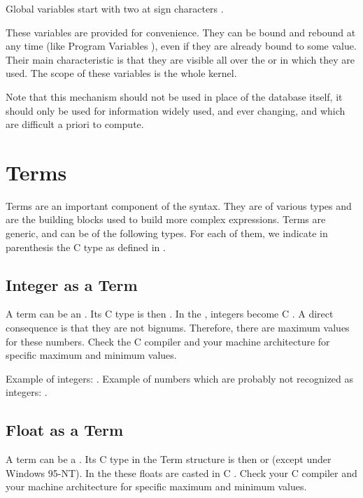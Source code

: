Global variables start with two at sign characters .

These variables are provided for convenience. They can be bound and rebound
at any time (like Program Variables ), even if
they are already bound to some value. Their main characteristic is that
they are visible all over the \CPK{} or \XPK{} in which they are used.
The scope of these variables is the whole kernel.

Note that this mechanism should not be used in place of the database itself, it
should only be used for information widely used, and ever changing, and which
are difficult a priori to compute.

\section{Terms}

Terms are an important component of the \COPRS{} syntax. They  are of various
types and are the building blocks used to build more complex
expressions.  Terms are generic, and can be of the following types. For each of
them, we indicate in parenthesis the C type as defined in
.



\subsection{Integer as a Term}

A term can be an .  Its C type is then . In the \CPK{},
integers become C . A direct consequence is that they are not
bignums. Therefore, there are maximum values for these numbers. Check the C
compiler and your machine architecture for specific maximum and minimum
values.

Example of integers: . \*
Example of numbers which are probably not recognized as integers:
.

\subsection{Float as a Term}

A term can be a . Its C type in the Term structure is then
 or  (except under Windows 95-NT).  In the \CPK{}
these floats are casted in C . Check your C compiler and your
machine architecture for specific maximum and minimum values.

